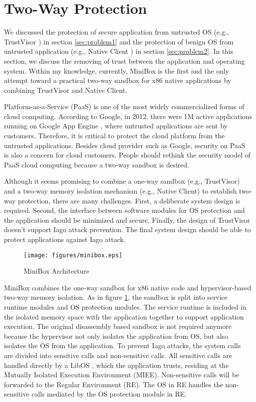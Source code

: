 \section{Two-Way Protection}
\label{sec:problem3}

We discussed the protection of secure application from untrusted OS (e.g.,
TrustVisor \cite{TrustVisor}) in section \ref{sec:problem1} and the protection
of benign OS from untrusted application (e.g., Native Client \cite{NaCl}) in
section \ref{sec:problem2}. In this section, we discuss the removing of trust
between the application and operating system. Within my knowledge, currently,
MiniBox \cite{MiniBox} is the first and the only attempt toward a practical
two-way sandbox for x86 native applications by combining TrustVisor and
Native Client.

Platform-as-a-Service (PaaS) is one of the most widely commercialized forms of
cloud computing. According to Google, in 2012, there were 1M active
applications running on Google App Engine \cite{engine}, where untrusted
applications are sent by customers. Therefore, it is critical to protect the
cloud platform from the untrusted applications. Besides cloud provider such as
Google, security on PaaS is also a concern for cloud customers. People should
rethink the security model of PaaS cloud computing because a two-way sandbox is
desired.

Although it seems promising to combine a one-way sandbox (e.g., TrustVisor) and
a two-way memory isolation mechanism (e.g., Native Client) to establish two-way
protection, there are many challenges. First, a deliberate system design is
required. Second, the interface between software modules for OS protection and
the application should be minimized and secure. Finally, the design of
TrustVisor doesn't support Iago attack prevention. The final system design
should be able to protect applications against Iago attack.

\begin{figure}[htb]
\centering
\texttt{[image: figures/minibox.eps]}
\caption{MiniBox Architecture}
\label{fig:minibox}
\end{figure}

MiniBox \cite{MiniBox} combines the one-way sandbox for x86 native code and
hypervisor-based two-way memory isolation. As in figure \ref{fig:minibox}, the
sandbox is split into service runtime modules and OS protection modules. The
service runtime is included in the isolated memory space with the application
together to support application execution. The original disassembly based
sandbox is not required anymore because the hypervisor not only isolates the
application from OS, but also isolates the OS from the application. To prevent
Iago attacks, the system calls are divided into sensitive calls and
non-sensitive calls. All sensitive calls are handled directly by a LibOS
\cite{LibOS}, which the application trusts, residing at the Mutually Isolated
Execution Environment (MIEE).  Non-sensitive calls will be forwarded to the
Regular Environment (RE). The OS in RE handles the non-sensitive calls mediated
by the OS protection module in RE. 
